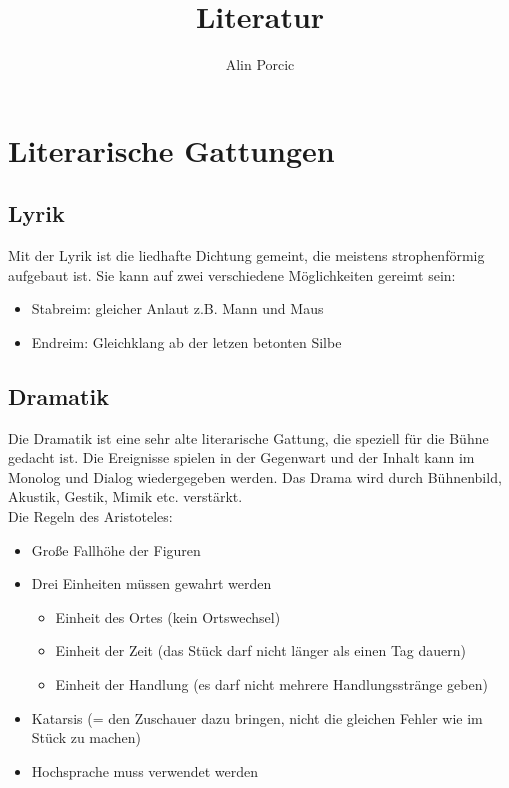 \documentclass[12pt,a4paper]{article}
\title{Literatur}
\author{Alin Porcic}
\begin{document}
\maketitle
\newpage
\tableofcontents
\newpage

\section{Literarische Gattungen}
\subsection{Lyrik}

Mit der Lyrik ist die liedhafte Dichtung gemeint, die meistens strophenförmig aufgebaut ist. Sie kann auf zwei verschiedene Möglichkeiten gereimt sein:
	\begin{itemize}
	\item Stabreim: gleicher Anlaut z.B. Mann und Maus
	\item Endreim: Gleichklang ab der letzen betonten Silbe
	\end{itemize}

\subsection{Dramatik}

Die Dramatik ist eine sehr alte literarische Gattung, die speziell für die Bühne gedacht ist. Die Ereignisse spielen in der Gegenwart und der Inhalt kann im Monolog und Dialog wiedergegeben werden. Das Drama wird durch Bühnenbild, Akustik, Gestik, Mimik etc. verstärkt.\\
\newline
\newline
Die Regeln des Aristoteles:

	\begin{itemize}
	\item Große Fallhöhe der Figuren
	\item Drei Einheiten müssen gewahrt werden
		\begin{itemize}
		\item Einheit des Ortes (kein Ortswechsel)
		\item Einheit der Zeit (das Stück darf nicht länger als einen Tag dauern)
		\item Einheit der Handlung (es darf nicht mehrere Handlungsstränge geben)
		\end{itemize}
	\item Katarsis (= den Zuschauer dazu bringen, nicht die gleichen Fehler wie im Stück zu machen)
	\item Hochsprache muss verwendet werden
	\end{itemize}
\end{document}
